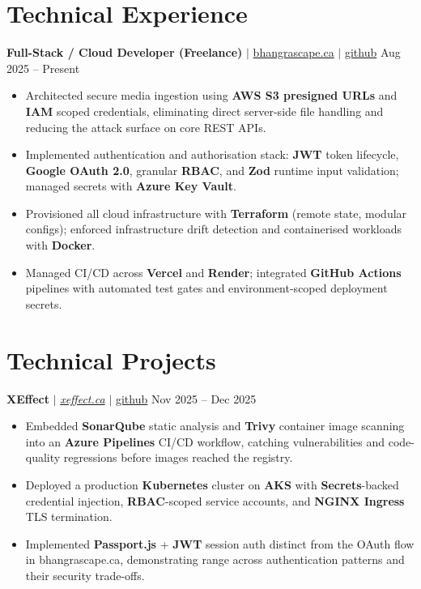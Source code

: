 \documentclass[11pt,a4paper]{article}
\begin{document}
\section{Technical Experience}

\textbf{Full-Stack / Cloud Developer (Freelance)} $|$ \href{https://bhangrascape.ca}{bhangrascape.ca} $|$ \href{https://github.com/bhat0155/bhangraescape}{\small github} \hfill Aug 2025 -- Present
\begin{itemize}
    \item Architected secure media ingestion using \textbf{AWS S3 presigned URLs} and \textbf{IAM} scoped credentials, eliminating direct server-side file handling and reducing the attack surface on core REST APIs.
    \item Implemented authentication and authorisation stack: \textbf{JWT} token lifecycle, \textbf{Google OAuth 2.0}, granular \textbf{RBAC}, and \textbf{Zod} runtime input validation; managed secrets with \textbf{Azure Key Vault}.
    \item Provisioned all cloud infrastructure with \textbf{Terraform} (remote state, modular configs); enforced infrastructure drift detection and containerised workloads with \textbf{Docker}.
    \item Managed CI/CD across \textbf{Vercel} and \textbf{Render}; integrated \textbf{GitHub Actions} pipelines with automated test gates and environment-scoped deployment secrets.
\end{itemize}

\section{Technical Projects}

\textbf{XEffect} $|$ \href{https://www.xeffect.ca/app}{\emph{xeffect.ca}} $|$ \href{https://github.com/bhat0155/xeffect}{\small github} \hfill Nov 2025 -- Dec 2025
\begin{itemize}
    \item Embedded \textbf{SonarQube} static analysis and \textbf{Trivy} container image scanning into an \textbf{Azure Pipelines} CI/CD workflow, catching vulnerabilities and code-quality regressions before images reached the registry.
    \item Deployed a production \textbf{Kubernetes} cluster on \textbf{AKS} with \textbf{Secrets}-backed credential injection, \textbf{RBAC}-scoped service accounts, and \textbf{NGINX Ingress} TLS termination.
    \item Implemented \textbf{Passport.js} + \textbf{JWT} session auth distinct from the OAuth flow in bhangrascape.ca, demonstrating range across authentication patterns and their security trade-offs.
\end{itemize}
\end{document}
